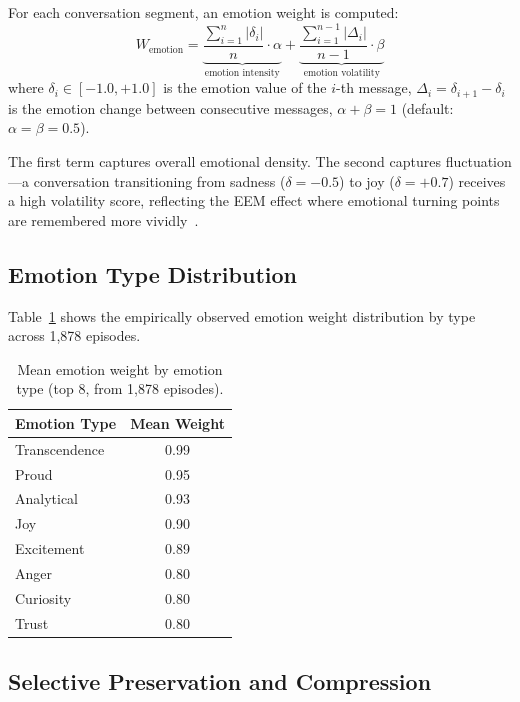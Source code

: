 \documentclass[11pt,a4paper]{article}
\begin{document}
For each conversation segment, an emotion weight is computed:
\begin{equation}
  W_{\text{emotion}}
  = \underbrace{\frac{\sum_{i=1}^{n} |\delta_i|}{n} \cdot \alpha}_{\text{emotion intensity}}
  + \underbrace{\frac{\sum_{i=1}^{n-1} |\Delta_i|}{n-1} \cdot \beta}_{\text{emotion volatility}}
  \label{eq:emotion_weight}
\end{equation}
where $\delta_i \in [-1.0, +1.0]$ is the emotion value of the $i$-th message, $\Delta_i = \delta_{i+1} - \delta_i$ is the emotion change between consecutive messages, $\alpha + \beta = 1$ (default: $\alpha = \beta = 0.5$).

The first term captures overall emotional density. The second captures fluctuation---a conversation transitioning from sadness ($\delta = -0.5$) to joy ($\delta = +0.7$) receives a high volatility score, reflecting the EEM effect where emotional turning points are remembered more vividly~\citep{labar2006cognitive}.

\subsection{Emotion Type Distribution}

Table~\ref{tab:emotion_types} shows the empirically observed emotion weight distribution by type across 1,878 episodes.

\begin{table}[h]
\centering
\caption{Mean emotion weight by emotion type (top 8, from 1,878 episodes).}
\label{tab:emotion_types}
\small
\begin{tabular}{@{}lc@{}}
\toprule
\textbf{Emotion Type} & \textbf{Mean Weight} \\
\midrule
Transcendence & 0.99 \\
Proud & 0.95 \\
Analytical & 0.93 \\
Joy & 0.90 \\
Excitement & 0.89 \\
Anger & 0.80 \\
Curiosity & 0.80 \\
Trust & 0.80 \\
\bottomrule
\end{tabular}
\end{table}

\subsection{Selective Preservation and Compression}
\end{document}
